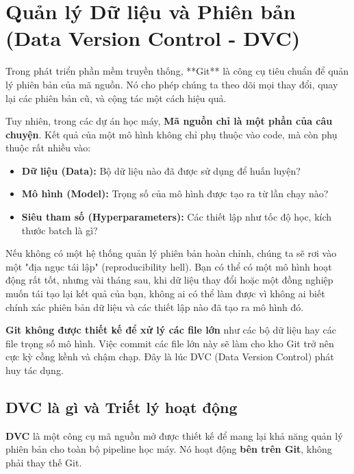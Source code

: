
\section{Quản lý Dữ liệu và Phiên bản (Data Version Control - DVC)}
\label{sec:dvc}

Trong phát triển phần mềm truyền thống, **Git** là công cụ tiêu chuẩn để quản lý phiên bản của mã nguồn. Nó cho phép chúng ta theo dõi mọi thay đổi, quay lại các phiên bản cũ, và cộng tác một cách hiệu quả.

Tuy nhiên, trong các dự án học máy, \textbf{Mã nguồn chỉ là một phần của câu chuyện}. Kết quả của một mô hình không chỉ phụ thuộc vào code, mà còn phụ thuộc rất nhiều vào:
\begin{itemize}
    \item \textbf{Dữ liệu (Data):} Bộ dữ liệu nào đã được sử dụng để huấn luyện?
    \item \textbf{Mô hình (Model):} Trọng số của mô hình được tạo ra từ lần chạy nào?
    \item \textbf{Siêu tham số (Hyperparameters):} Các thiết lập như tốc độ học, kích thước batch là gì?
\end{itemize}

\begin{tcolorbox}[
    title=Vấn đề: "Nó chạy được trên máy của tôi mà!",
    colback=red!5!white, colframe=red!75!black, fonttitle=\bfseries
]
Nếu không có một hệ thống quản lý phiên bản hoàn chỉnh, chúng ta sẽ rơi vào một "địa ngục tái lập" (reproducibility hell). Bạn có thể có một mô hình hoạt động rất tốt, nhưng vài tháng sau, khi dữ liệu thay đổi hoặc một đồng nghiệp muốn tái tạo lại kết quả của bạn, không ai có thể làm được vì không ai biết chính xác phiên bản dữ liệu và các thiết lập nào đã tạo ra mô hình đó.
\end{tcolorbox}

\textbf{Git không được thiết kế để xử lý các file lớn} như các bộ dữ liệu hay các file trọng số mô hình. Việc commit các file lớn này sẽ làm cho kho Git trở nên cực kỳ cồng kềnh và chậm chạp. Đây là lúc DVC (Data Version Control) phát huy tác dụng.

\subsection{DVC là gì và Triết lý hoạt động}
\label{ssec:what_is_dvc}

\textbf{DVC} là một công cụ mã nguồn mở được thiết kế để mang lại khả năng quản lý phiên bản cho toàn bộ pipeline học máy. Nó hoạt động \textbf{bên trên Git}, không phải thay thế Git.

